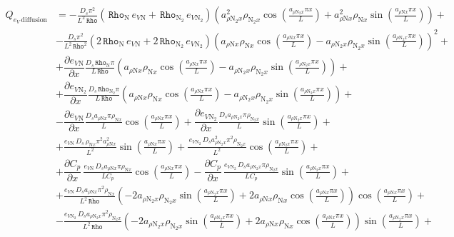 \documentclass[10pt]{article}
\newcommand{\diff}[2] {\dfrac{\partial #1 }{\partial #2}}
\newcommand{\Rho}{\,\mathtt{Rho}}
\newcommand{\N}{\text{N}}
\newcommand{\DCpDx}{\diff{C_p}{x}\,}
\newcommand{\DeVNDx}{\diff{e_{V \N}}{x}}
\newcommand{\DeVNNDx}{\diff{e_{V \N_2}}{x}}
\newcommand{\diffusion}{\,\text{diffusion}}
\begin{document}
\begin{equation*}
\begin{split}
%
Q_{e_V \diffusion} &= 
- \frac{D_s \pi^{2} }{L^{2} \Rho}\left(\Rho_{\N} \, e_{V {\N}} + \Rho_{\N_2} \, e_{V {\N_2}}\right) \left(a_{ \rho \N_2 x}^{2} \rho_{\N_2 x} \cos\left(\frac{a_{ \rho \N_2 x} \pi x}{L}\right) + a_{ \rho \N x}^{2} \rho_{\N x} \sin\left(\frac{a_{ \rho \N x} \pi x}{L}\right)\right) +\\ 
%
& - \frac{D_s \pi^{2} }{L^{2} \Rho^{2}}\left(2 \Rho_{\N} \, e_{V {\N}} + 2 \Rho_{\N_2} \, e_{V {\N_2}}\right)\left(a_{ \rho \N x} \rho_{\N x} \cos\left(\frac{a_{ \rho \N x} \pi x}{L}\right) - a_{ \rho \N_2 x} \rho_{\N_2 x} \sin\left(\frac{a_{ \rho \N_2 x} \pi x}{L}\right)\right)^{2} +\\
%
&+ \DeVNDx \frac{ D_s \Rho_{\N} \pi }{L \Rho} \left(a_{ \rho \N x} \rho_{\N x} \cos\left(\frac{a_{ \rho \N x} \pi x}{L}\right) - a_{ \rho \N_2 x} \rho_{\N_2 x} \sin\left(\frac{a_{ \rho \N_2 x} \pi x}{L}\right)\right)+\\
%
& + \DeVNNDx \frac{ D_s \Rho_{\N_2} \pi }{L \Rho}\left(a_{ \rho \N x} \rho_{\N x} \cos\left(\frac{a_{ \rho \N x} \pi x}{L}\right) - a_{ \rho \N_2 x} \rho_{\N_2 x} \sin\left(\frac{a_{ \rho \N_2 x} \pi x}{L}\right)\right) +\\
%
&- \DeVNDx \frac{ D_s a_{ \rho \N x} \pi \rho_{\N x} }{L} \cos\left(\frac{a_{ \rho \N x} \pi x}{L}\right)+ \DeVNNDx \frac{ D_s a_{ \rho \N_2 x}\pi \rho_{\N_2 x} }{L}\sin\left(\frac{a_{ \rho \N_2 x} \pi x}{L}\right) +\\
%
&+ \frac{ e_{V {\N}} \, D_s \, \rho_{\N x} \pi^{2} a_{ \rho \N x}^{2} }{L^{2}}\sin\left(\frac{a_{ \rho \N x} \pi x}{L}\right) + \frac{\, e_{V {\N_2}} \, D_s a_{ \rho \N_2 x}^{2} \pi^{2} \rho_{\N_2 x} }{L^{2}}\cos\left(\frac{a_{ \rho \N_2 x} \pi x}{L}\right) +\\ 
%
& + \DCpDx \frac{ e_{V {\N}} \, D_s a_{ \rho \N x} \pi \rho_{\N x} }{L C_p}\cos\left(\frac{a_{ \rho \N x} \pi x}{L}\right) - \DCpDx \frac{e_{V {\N_2}} \, D_s a_{ \rho \N_2 x} \pi \rho_{\N_2 x} }{L C_p}\sin\left(\frac{a_{ \rho \N_2 x} \pi x}{L}\right) +\\
%
&+ \frac{e_{V {\N}}\, D_s a_{ \rho \N x}  \pi^{2} \rho_{\N x} }{L^{2} \Rho} \left(- 2 a_{ \rho \N_2 x} \rho_{\N_2 x} \sin\left(\frac{a_{ \rho \N_2 x} \pi x}{L}\right) + 2 a_{ \rho \N x} \rho_{\N x} \cos\left(\frac{a_{ \rho \N x} \pi x}{L}\right)\right) \cos\left(\frac{a_{ \rho \N x} \pi x}{L}\right)+\\ 
%
&- \frac{ e_{V {\N_2}} \, D_s a_{ \rho \N_2 x} \pi^{2} \rho_{\N_2 x} }{L^{2} \Rho}\left(- 2 a_{ \rho \N_2 x} \rho_{\N_2 x} \sin\left(\frac{a_{ \rho \N_2 x} \pi x}{L}\right) + 2 a_{ \rho \N x} \rho_{\N x} \cos\left(\frac{a_{ \rho \N x} \pi x}{L}\right)\right) \sin\left(\frac{a_{ \rho \N_2 x} \pi x}{L}\right) +\\ 

\end{split}
\end{equation*}
\end{document}
